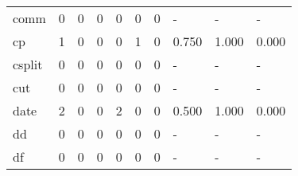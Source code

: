 \begin{longtable}{lp{2.0cm}p{2.0cm}p{2.0cm}p{2.0cm}p{2.0cm}p{2.0cm}p{2.0cm}p{2.0cm}p{2.0cm}}
comm      &                      0 &                                             0 &                                            0 &                                           0 &                                            0 &                                          0 &                                    - &                                      - &                                    - \\
cp        &                      1 &                                             0 &                                            0 &                                           0 &                                            1 &                                          0 &                                0.750 &                                  1.000 &                                0.000 \\
csplit    &                      0 &                                             0 &                                            0 &                                           0 &                                            0 &                                          0 &                                    - &                                      - &                                    - \\
cut       &                      0 &                                             0 &                                            0 &                                           0 &                                            0 &                                          0 &                                    - &                                      - &                                    - \\
date      &                      2 &                                             0 &                                            0 &                                           2 &                                            0 &                                          0 &                                0.500 &                                  1.000 &                                0.000 \\
dd        &                      0 &                                             0 &                                            0 &                                           0 &                                            0 &                                          0 &                                    - &                                      - &                                    - \\
df        &                      0 &                                             0 &                                            0 &                                           0 &                                            0 &                                          0 &                                    - &                                      - &                                    - \\

\end{longtable}
